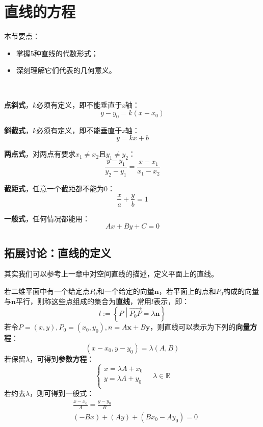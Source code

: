 \section{直线的方程}

本节要点：
\begin{itemize}
    \item 掌握5种直线的代数形式；
    \item 深刻理解它们代表的几何意义。
\end{itemize}

~

{\bf 点斜式}，$k$必须有定义，即不能垂直于{\it x}轴：
\[
y-y_0=k\left( x-x_0 \right)
\]

{\bf 斜截式}，$k$必须有定义，即不能垂直于{\it x}轴：
\[
y=kx+b
\]

{\bf 两点式}，对两点有要求$x_1\ne x_2$且$y_1\ne y_2$：
\[
\frac{y-y_1}{y_2-y_1}=\frac{x-x_1}{x_1-x_2}
\]

{\bf 截距式}，任意一个截距都不能为0：
\[
\frac{x}{a}+\frac{y}{b}=1
\]

{\bf 一般式}，任何情况都能用：
\[
Ax+By+C=0
\]

\subsection{拓展讨论：直线的定义}

其实我们可以参考上一章中对空间直线的描述，定义平面上的直线。

\begin{definition}[直线]
若二维平面中有一个给定点$P_0$和一个给定的向量$\boldsymbol{n}$，若平面上的点和$P_0$构成的向量与$\boldsymbol{n}$平行，则称这些点组成的集合为{\bf 直线}，常用$l$表示，即：
\[
l:=\left\{ P \middle| \overrightarrow{P_0P}=\lambda \boldsymbol{n} \right\}
\]
若令$P=\left( x,y \right) ,P_0=\left( x_0,y_0 \right) ,n=A\boldsymbol{x}+B\boldsymbol{y}$，则直线可以表示为下列的{\bf 向量方程}：
\[
\left( x-x_0,y-y_0 \right) =\lambda \left( A,B \right)
\]
若保留$\lambda $，可得到{\bf 参数方程}：
\[
\begin{cases}
	x=\lambda A+x_0\\
	y=\lambda A+y_0\\
\end{cases} \quad \lambda \in \mathbb{R}
\]
若约去$\lambda $，则可得到一般式：
\begin{align*}
&\frac{x-x_0}{A}=\frac{y-y_0}{B} \\
&\left( -Bx \right) +\left( Ay \right) +\left( Bx_0-Ay_0 \right) =0
\end{align*}
\end{definition}


